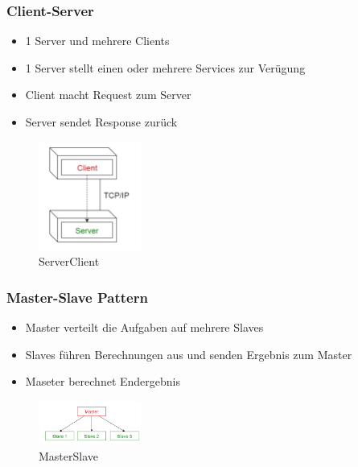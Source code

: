 \documentclass{article}
\begin{document}
\subsubsection{Client-Server}

\begin{multicols}{2}
	\begin{itemize}
		\item 1 Server und mehrere Clients		
		\item 1 Server stellt einen oder mehrere Services zur Verügung		
		\item Client macht Request zum Server		
		\item Server sendet Response zurück		
	\end{itemize}
\columnbreak

\begin{figure}[H]			\includegraphics[width=0.3\textwidth] {Resources/Images/ServerClient.png}
\caption{\label{fig:ServerClient}ServerClient}
\end{figure}

\end{multicols}

\subsubsection{Master-Slave Pattern}

\begin{multicols}{2}
	\begin{itemize}
		\item Master verteilt die Aufgaben auf mehrere Slaves	
		\item Slaves führen Berechnungen aus und senden Ergebnis zum Master
		\item Maseter berechnet Endergebnis		
	\end{itemize}
\columnbreak

\begin{figure}[H]			\includegraphics[width=0.3\textwidth] {Resources/Images/MasterSlave.png}
\caption{\label{fig:MasterSlave}MasterSlave}
\end{figure}

\end{multicols}
\end{document}
